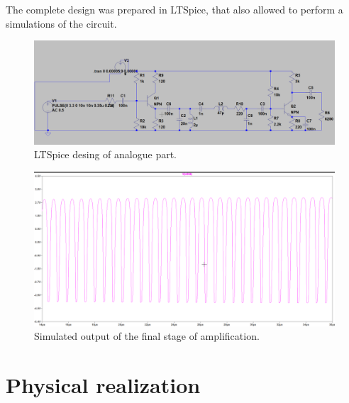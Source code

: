 \documentclass[eng,printmode, openany]{mgr}
\begin{document}
The complete design was prepared in LTSpice, that also allowed to perform a simulations of the circuit.
\begin{figure}[h]
	\centering
	\includegraphics[width=0.9\linewidth]{design}
	\caption{LTSpice desing of analogue part.}
	\label{fig:design}
\end{figure}
\begin{figure}[h]
	\centering
	\includegraphics[width=0.7\linewidth]{output}
	\caption{Simulated output of the final stage of amplification.}
	\label{fig:output}
\end{figure}

\chapter{Physical realization}

\end{document}
